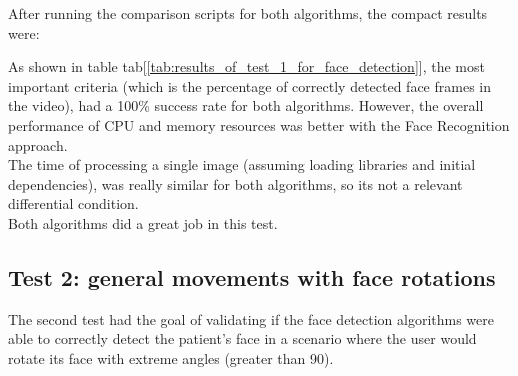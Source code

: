 \documentclass[11pt]{report} %
\begin{document}
After running the comparison scripts for both algorithms, the compact results were:

\begin{table}[H]
\begin{center}
\caption{\label{tab:results_of_test_1_for_face_detection} Results of test 1 for face detection algorithms. Own development.}
\end{center}
\end{table}

As shown in table tab[\ref{tab:results_of_test_1_for_face_detection}], the most important criteria (which is the percentage of correctly detected face frames in the video), had a 100\% success rate for both algorithms. However, the overall performance of CPU and memory resources was better with the Face Recognition approach.\\

The time of processing a single image (assuming loading libraries and initial dependencies), was really similar for both algorithms, so its not a relevant differential condition.\\

Both algorithms did a great job in this test.\\

\subsection{Test 2: general movements with face rotations}
\label{sec:test_2_general_movements_with_face_rotations}

The second test had the goal of validating if the face detection algorithms were able to correctly detect the patient's face in a scenario where the user would rotate its face with extreme angles (greater than 90\textdegree).\\
\end{document}
